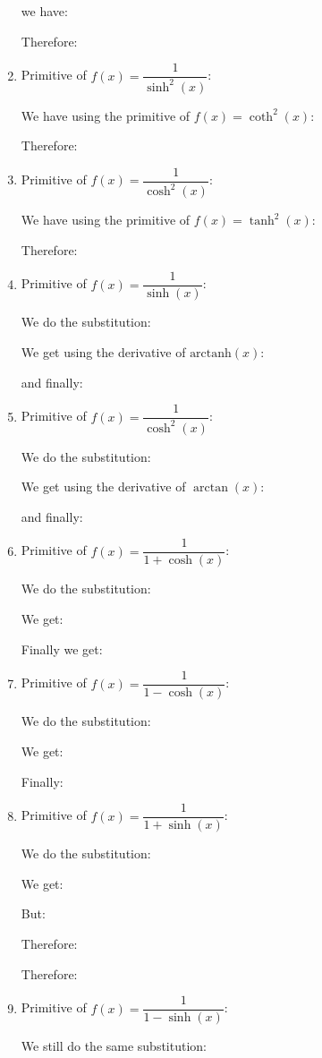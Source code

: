 \begin{enumerate}
		we have:
		
		Therefore:
		
		
		\item Primitive of $f(x)=\dfrac{1}{\sinh^2(x)}$:
		
		We have using the primitive of $f(x)=\coth^2(x)$:
		
		Therefore:
		
		
		\item Primitive of $f(x)=\dfrac{1}{\cosh^2(x)}$:
		
		We have using the primitive of $f(x)=\tanh^2(x)$:
		
		Therefore:
		
		
		\item Primitive of $f(x)=\dfrac{1}{\sinh(x)}$:
		
		We do the substitution:
		
		We get using the derivative of $\text{arctanh}(x)$:
		
		
		and finally:
		
		
		\item Primitive of $f(x)=\dfrac{1}{\cosh^2(x)}$:
		
		We do the substitution:
		
		We get using the derivative of $\arctan(x)$:
		
		and finally:
		
		\item Primitive of $f(x)=\dfrac{1}{1+\cosh(x)}$:
		
		We do the substitution:
		
		We get:
		
		Finally we get:
		
		
		\item Primitive of $f(x)=\dfrac{1}{1-\cosh(x)}$:
		
		We do the substitution:
		
		We get:
		
		Finally:
		
		
		\item Primitive of $f(x)=\dfrac{1}{1+\sinh(x)}$:
		
		We do the substitution:
		
		We get:
		
		But:
		
		Therefore:
		
		Therefore:
		
		
		\item Primitive of $f(x)=\dfrac{1}{1-\sinh(x)}$:
		
		We still do the same substitution:
		

\end{enumerate}
